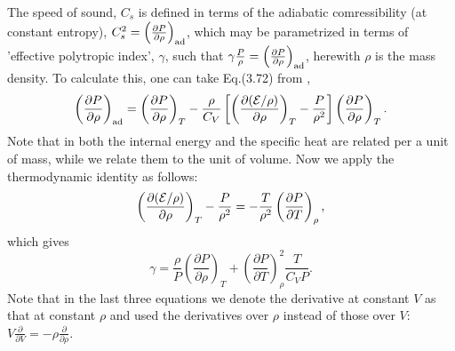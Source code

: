 The speed of sound, $C_s$ is defined in terms of the adiabatic comressibility (at constant entropy), $C_s^2=\left(\frac{\partial P}{\partial \rho}\right)_{\rm ad}$, which
may be parametrized in terms of 'effective polytropic index', $\gamma$, such that 
$\gamma\frac{P}\rho=\left(\frac{\partial P}{\partial \rho}\right)_{\rm ad}$, herewith $\rho$ is the mass density. To calculate this, one can take Eq.(3.72) from 
\cite{drake}, 
$$
\left(\frac{\partial P}{\partial \rho}\right)_{\rm ad}=\left(\frac{\partial P}{\partial \rho}\right)_T-
\frac{\rho}{C_V}\left[
\left( \frac{\partial({\cal E}/\rho)}{\partial \rho}\right)_T-\frac{P}{\rho^2}\right]\left(\frac{\partial P}{\partial \rho}\right)_T.
$$
Note that in \cite{drake} both the internal energy and the specific heat are related per a unit of mass, while we relate them to the unit of volume.  
Now we apply the thermodynamic identity as follows:
\begin{equation}
\left( \frac{\partial ({\cal E}/\rho)}{\partial \rho} \right)_{T} - \frac{P}{\rho^2} =
-\frac{T}{\rho^2} \left( \frac{\partial P}{\partial T} \right)_{\rho},
\end{equation}
which gives
\begin{equation}
\gamma = \frac{\rho}{P} \left( \frac{\partial P}{\partial \rho} \right)_T +
\left( \frac{\partial P}{\partial T} \right)^2_\rho \frac{T}{C_V P}.
\end{equation}
Note that in the last three equations we denote the derivative at constant $V$ as that at constant $\rho$ and used the derivatives over $\rho$ instead of those over $V$:
 $V\frac\partial{\partial V}=-\rho\frac\partial{\partial \rho}$.
